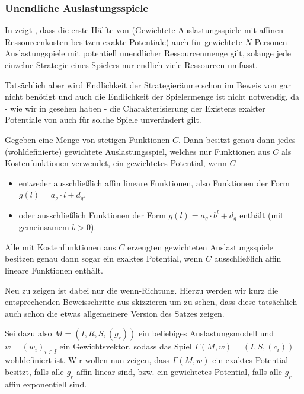 \subsubsection{Unendliche Auslastungsspiele}\label{sec:Auslastungsspiele:unendliche}

In \cite[Abschnitt 8]{AUniversalCostrGenPotGames} zeigt \citeauthor{AUniversalCostrGenPotGames}, dass die erste Hälfte von  (\glqq Gewichtete Auslastungsspiele mit affinen Ressourcenkosten besitzen exakte Potentiale\grqq) auch für gewichtete $N$-Personen-Auslastungspiele mit potentiell unendlicher Ressourcenmenge gilt, solange jede einzelne Strategie eines Spielers nur endlich viele Ressourcen umfasst. 

Tatsächlich aber wird Endlichkeit der Strategieräume schon im Beweis von \citeauthor{CharExGewPotinWCG} gar nicht benötigt und auch die Endlichkeit der Spielermenge ist nicht notwendig, da - wie wir in  gesehen haben - die Charakterisierung der Existenz exakter Potentiale von \citeauthor{MonShap} auch für solche Spiele unverändert gilt.

\begin{satz}\label{satz:CharExGewPotinWCG2}
	Gegeben eine Menge von stetigen Funktionen $C$. Dann besitzt genau dann jedes (wohldefinierte) gewichtete Auslastungsspiel, welches nur Funktionen aus $C$ als Kostenfunktionen verwendet, ein gewichtetes Potential, wenn $C$
	\begin{itemize}
		\item entweder ausschließlich affin lineare Funktionen, also Funktionen der Form $g(l) = a_g \cdot l + d_g$,
		\item oder ausschließlich Funktionen der Form $g(l) = a_g\cdot b^l + d_g$ enthält (mit gemeinsamem $b > 0$).
	\end{itemize}
	Alle mit Kostenfunktionen aus $C$ erzeugten gewichteten Auslastungsspiele besitzen genau dann sogar ein exaktes Potential, wenn $C$ ausschließlich affin lineare Funktionen enthält.
\end{satz}

Neu zu zeigen ist dabei nur die \glqq wenn\grqq-Richtung. Hierzu werden wir kurz die entsprechenden Beweisschritte aus \cite[Abschnitt 3]{CharExGewPotinWCG} skizzieren um zu sehen, dass diese tatsächlich auch schon die etwas allgemeinere Version des Satzes zeigen. 

Sei dazu also $M = (I, R, S, (g_r))$ ein beliebiges Auslastungsmodell und $w = (w_i)_{i \in I}$ ein Gewichtsvektor, sodass das Spiel $\Gamma(M, w) = (I, S, (c_i))$ wohldefiniert ist. Wir wollen nun zeigen, dass $\Gamma(M, w)$ ein exaktes Potential besitzt, falls alle $g_r$ affin linear sind, bzw. ein gewichtetes Potential, falls alle $g_r$ affin exponentiell sind.


